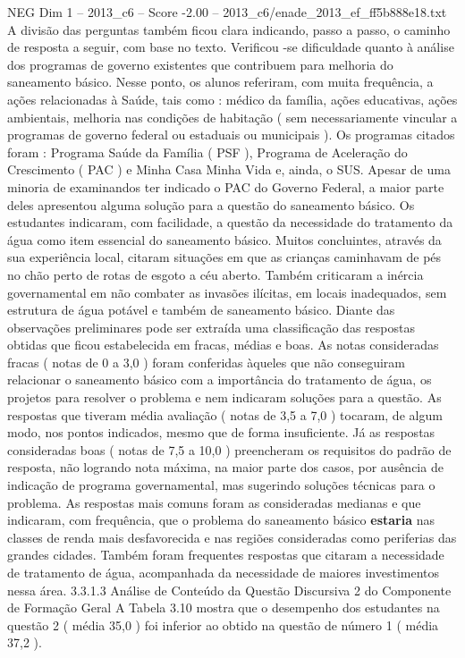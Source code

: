 \begin{textsample}{NEG Dim 1 – 2013\_c6 – Score -2.00 – 2013\_c6/enade\_2013\_ef\_ff5b888e18.txt}
A divisão das perguntas também ficou clara indicando, passo a passo, o caminho de resposta a seguir, com base no texto.
Verificou -se dificuldade quanto à análise dos programas de governo existentes que contribuem para melhoria do saneamento básico.
Nesse ponto, os alunos referiram, com muita frequência, a ações relacionadas à Saúde, tais como : médico da família, ações educativas, ações ambientais, melhoria nas condições de habitação ( sem necessariamente vincular a programas de governo federal ou estaduais ou municipais ).
Os programas citados foram : Programa Saúde da Família ( PSF ), Programa de Aceleração do Crescimento ( PAC ) e Minha Casa Minha Vida e, ainda, o SUS.
Apesar de uma minoria de examinandos ter indicado o PAC do Governo Federal, a maior parte deles apresentou alguma solução para a questão do saneamento básico.
Os estudantes indicaram, com facilidade, a questão da necessidade do tratamento da água como item essencial do saneamento básico.
Muitos concluintes, através da sua experiência local, citaram situações em que as crianças caminhavam de pés no chão perto de rotas de esgoto a céu aberto.
Também criticaram a inércia governamental em não combater as invasões ilícitas, em locais inadequados, sem estrutura de água potável e também de saneamento básico.
Diante das observações preliminares pode ser extraída uma classificação das respostas obtidas que ficou estabelecida em fracas, médias e boas.
As notas consideradas fracas ( notas de 0 a 3,0 ) foram conferidas àqueles que não conseguiram relacionar o saneamento básico com a importância do tratamento de água, os projetos para resolver o problema e nem indicaram soluções para a questão.
As respostas que tiveram média avaliação ( notas de 3,5 a 7,0 ) tocaram, de algum modo, nos pontos indicados, mesmo que de forma insuficiente.
Já as respostas consideradas boas ( notas de 7,5 a 10,0 ) preencheram os requisitos do padrão de resposta, não logrando nota máxima, na maior parte dos casos, por ausência de indicação de programa governamental, mas sugerindo soluções técnicas para o problema.
As respostas mais comuns foram as consideradas medianas e que indicaram, com frequência, que o problema do saneamento básico \textbf{estaria} nas classes de renda mais desfavorecida e nas regiões consideradas como periferias das grandes cidades.
Também foram frequentes respostas que citaram a necessidade de tratamento de água, acompanhada da necessidade de maiores investimentos nessa área. 3.3.1.3 Análise de Conteúdo da Questão Discursiva 2 do Componente de Formação Geral A Tabela 3.10 mostra que o desempenho dos estudantes na questão 2 ( média 35,0 ) foi inferior ao obtido na questão de número 1 ( média 37,2 ).

\end{textsample}
